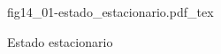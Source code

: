 \begin{figure}[h]
\centering
\def\svgwidth{0.5\textwidth}
{fig14_01-estado_estacionario.pdf_tex}
\caption{Estado estacionario}
\label{fig14_01-estado_estacionario}
\end{figure}